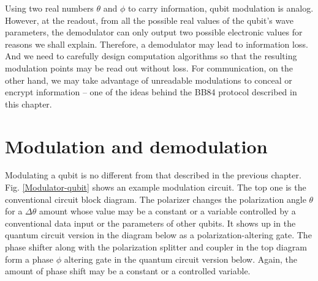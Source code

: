 \documentclass[oneside, letter, 12pt]{book}
\begin{document}
Using two real numbers $\theta$ and $\phi$ to carry information, qubit modulation is analog. However, at the readout, from all the possible real values of the qubit's wave parameters, the demodulator can only output two possible electronic values for reasons we shall explain. Therefore, a demodulator may lead to information loss. And we need to carefully design computation algorithms so that the resulting modulation points may be read out without loss. For communication, on the other hand, we may take advantage of unreadable modulations to conceal or encrypt information -- one of the ideas behind the BB84 protocol described in this chapter.

\section{Modulation and demodulation}\label{S-qModulation}
Modulating a qubit is no different from that described in the previous chapter. Fig. \ref{Modulator-qubit} shows an example modulation circuit. The top one is the conventional circuit block diagram. The polarizer changes the polarization angle $\theta$ for a $\Delta \theta$ amount whose value may be a constant or a variable controlled by a conventional data input or the parameters of other qubits. It shows up in the quantum circuit version in the diagram below as a polarization-altering gate. The phase shifter along with the polarization splitter and coupler in the top diagram form a phase $\phi$ altering gate in the quantum circuit version below. Again, the amount of phase shift may be a constant or a controlled variable. 
\end{document}
